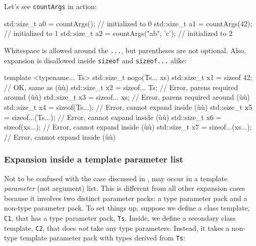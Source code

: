 \noindent Let's see \lstinline!countArgs! in action:

\begin{emcppslisting}[emcppsbatch=e32]
std::size_t a0 = countArgs();           // initialized to 0
std::size_t a1 = countArgs(42);         // initialized to 1
std::size_t a2 = countArgs("ab", 'c');  // initialized to 2
\end{emcppslisting}
    

\noindent Whitespace is allowed around the \lstinline!...!, but parentheses are not
optional. Also, expansion is disallowed inside \lstinline!sizeof! and
\lstinline!sizeof...! alike:

\begin{emcppslisting}[emcppsbatch=e32]
template <typename... Ts>
std::size_t nogo(Ts... xs)
{
    std::size_t x1 = sizeof 42;         // OK, same as (ù{}ù)
    std::size_t x2 = sizeof... Ts;      // Error, parens required around (ù{}ù)
    std::size_t x3 = sizeof... xs;      // Error, parens required around (ù{}ù)
    std::size_t x4 = sizeof(Ts...);     // Error, cannot expand inside (ù{}ù)
    std::size_t x5 = sizeof...(Ts...);  // Error, cannot expand inside (ù{}ù)
    std::size_t x6 = sizeof(xs...);     // Error, cannot expand inside (ù{}ù)
    std::size_t x7 = sizeof...(xs...);  // Error, cannot expand inside (ù{}ù)
}
\end{emcppslisting}
    

\subsubsection[Expansion inside a template parameter list]{Expansion inside a template parameter list}\label{expansion-inside-a-template-parameter-list}

Not to be confused with the case discussed in ,  may occur in a
template \emph{parameter} (not argument) list. This is different from
all other expansion cases because it involves two distinct parameter
packs: a type parameter pack and a non-type parameter pack. To set
things up, suppose we define a class template, \lstinline!C1!, that has a
type parameter pack, \lstinline!Ts!. Inside, we define a secondary class
template, \lstinline!C2!, that does \emph{not} take any type parameters.
Instead, it takes a non-type template parameter pack with types derived
from \lstinline!Ts!:

